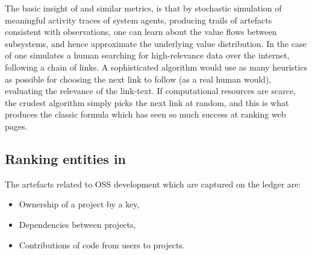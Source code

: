 
The basic insight of \pagerank{} and similar metrics, is that by
stochastic simulation of meaningful activity traces of system agents,
producing trails of artefacts consistent with observations, one can
learn about the value flows between subsystems, and hence approximate
the underlying value distribution. In the case of \pagerank{} one
simulates a human searching for high-relevance data over the internet,
following a chain of links. A sophisticated algorithm would use as
many heuristics as possible for choosing the next link to follow (as a
real human would), \eg{} evaluating the relevance of the link-text. If
computational resources are scarce, the crudest algorithm simply picks
the next link at random, and this is what produces the classic
\pagerank{} formula which has seen so much success at ranking web
pages.

\subsection{Ranking entities in \oscoin{}}

The artefacts related to OSS development which are captured on the \oscoin{}
ledger are:
\begin{itemize}
  \item Ownership of a project by a key,
  \item Dependencies between projects,
  \item Contributions of code from users to projects.
\end{itemize}

\begin{center}
\end{center}

